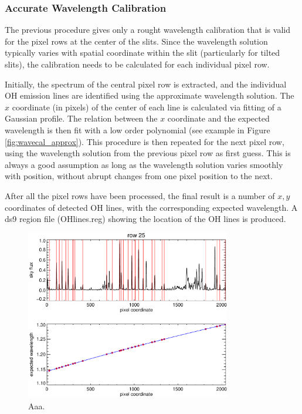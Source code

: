 \documentclass[a4paper, notitlepage]{article}
\begin{document}
\subsubsection{Accurate Wavelength Calibration}

The previous procedure gives only a rought wavelength calibration that is valid for the pixel rows at the center of the slits. Since the wavelength solution typically varies with spatial coordinate within the slit (particularly for tilted slits), the calibration needs to be calculated for each individual pixel row.

Initially, the spectrum of the central pixel row is extracted, and the individual OH emission lines are identified using the approximate wavelength solution. The $x$ coordinate (in pixels) of the center of each line is calculated via fitting of a Gaussian profile. The relation between the $x$ coordinate and the expected wavelength is then fit with a low order polynomial (see example in Figure \ref{fig:wavecal_approx}). This procedure is then repeated for the next pixel row, using the wavelength solution from the previous pixel row as first guess. This is always a good assumption as long as the wavelength solution varies smoothly with position, without abrupt changes from one pixel position to the next.

After all the pixel rows have been processed, the final result is a number of $x,y$ coordinates of detected OH lines, with the corresponding expected wavelength. A ds9 region file (OHlines.reg) showing the location of the OH lines is produced.


\begin{figure}[htbp]
\centering
\includegraphics[width=0.8\textwidth]{wavecal_accurate}
\caption{Aaa.}
\label{fig:wavecal_accurate}
\end{figure}
\end{document}
